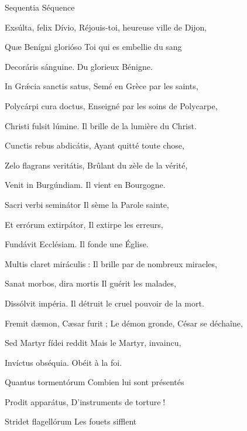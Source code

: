 \begin{paracol}{2}
Sequentia
\switchcolumn
Séquence
\switchcolumn*

Exsúlta, felix Dívio,
\switchcolumn
Réjouis-toi, heureuse ville de Dijon,
\switchcolumn*

Quæ Benígni glorióso
\switchcolumn
Toi qui es embellie du sang
\switchcolumn*

Decoráris sánguine.
\switchcolumn
Du glorieux Bénigne.
\switchcolumn*

In Grǽcia sanctis satus,
\switchcolumn
Semé en Grèce par les saints,
\switchcolumn*

Polycárpi cura doctus,
\switchcolumn
Enseigné par les soins de Polycarpe,
\switchcolumn*

Christi fulsit lúmine.
\switchcolumn
Il brille de la lumière du Christ.
\switchcolumn*

Cunctis rebus abdicátis,
\switchcolumn
Ayant quitté toute chose,
\switchcolumn*

Zelo flagrans veritátis,
\switchcolumn
Brûlant du zèle de la vérité,
\switchcolumn*

Venit in Burgúndiam.
\switchcolumn
Il vient en Bourgogne.
\switchcolumn*

Sacri verbi seminátor
\switchcolumn
Il sème la Parole sainte,
\switchcolumn*

Et errórum extirpátor,
\switchcolumn
Il extirpe les erreurs,
\switchcolumn*

Fundávit Ecclésiam.
\switchcolumn
Il fonde une Église.
\switchcolumn*

Multis claret miráculis :
\switchcolumn
Il brille par de nombreux miracles,
\switchcolumn*

Sanat morbos, dira mortis
\switchcolumn
Il guérit les malades,
\switchcolumn*

Dissólvit impéria.
\switchcolumn
Il détruit le cruel pouvoir de la mort.
\switchcolumn*

Fremit dæmon, Cæsar furit ;
\switchcolumn
Le démon gronde, César se déchaîne,
\switchcolumn*

Sed Martyr fídei reddit
\switchcolumn
Mais le Martyr, invaincu,
\switchcolumn*

Invíctus obséquia.
\switchcolumn
Obéit à la foi.
\switchcolumn*

Quantus tormentórum
\switchcolumn
Combien lui sont présentés
\switchcolumn*

Prodit apparátus,
\switchcolumn
D’instruments de torture !
\switchcolumn*

Stridet flagellórum
\switchcolumn
Les fouets sifflent
\switchcolumn*


\end{paracol}
